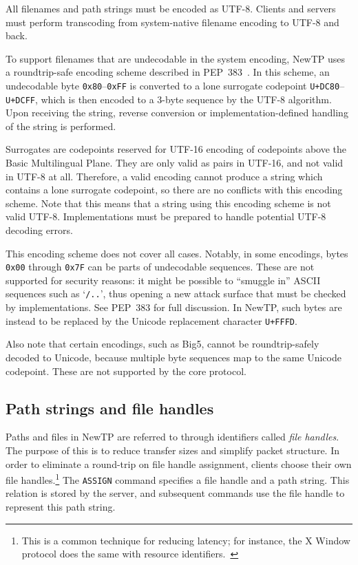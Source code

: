 All filenames and path strings must be encoded as UTF-8. Clients and servers must perform transcoding from
system-native filename encoding to UTF-8 and back.

To support filenames that are undecodable in the system encoding, NewTP uses a roundtrip-safe encoding scheme
described in PEP~383~\cite{pep383}. In this scheme, an undecodable byte {\tt 0x80}--{\tt 0xFF} is converted to
a lone surrogate codepoint {\tt U+DC80}--{\tt U+DCFF}, which is then encoded to a 3-byte sequence by the UTF-8
algorithm. Upon receiving the string, reverse conversion or implementation-defined handling of the string is
performed.

Surrogates are codepoints reserved for UTF-16 encoding of codepoints above the Basic Multilingual Plane. They
are only valid as pairs in UTF-16, and not valid in UTF-8 at all. Therefore, a valid encoding cannot produce
a string which contains a lone surrogate codepoint, so there are no conflicts with this encoding scheme. Note
that this means that a string using this encoding scheme is not valid UTF-8. Implementations must be prepared
to handle potential UTF-8 decoding errors.

This encoding scheme does not cover all cases. Notably, in some encodings, bytes {\tt 0x00} through {\tt 0x7F}
can be parts of undecodable sequences. These are not supported for security reasons: it might be possible to
``smuggle in'' ASCII sequences such as `{\tt /..}', thus opening a new attack surface that must be checked by
implementations. See PEP~383 for full discussion. In NewTP, such bytes are instead to be replaced by the
Unicode replacement character {\tt U+FFFD}.

Also note that certain encodings, such as Big5, cannot be roundtrip-safely decoded to Unicode, because
multiple byte sequences map to the same Unicode codepoint. These are not supported by the core protocol.

%

\subsection{Path strings and file handles}
\label{ssec:paths}

Paths and files in NewTP are referred to through identifiers called {\it file handles}. The purpose of this is
to reduce transfer sizes and simplify packet structure. In order to eliminate a round-trip on file handle
assignment, clients choose their own file handles.\footnote{This is a common technique for reducing latency;
for instance, the X Window protocol does the same with resource identifiers.~\cite{xwindow}} The {\tt ASSIGN}
command specifies a file handle and a path string. This relation is stored by the server, and subsequent
commands use the file handle to represent this path string.

